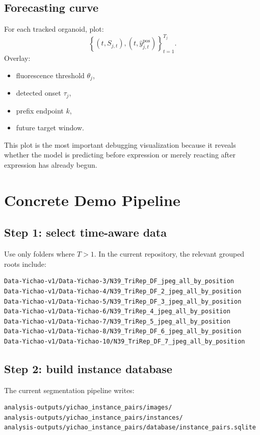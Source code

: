 \documentclass[11pt]{article}
\newcommand{\1}{\mathbf{1}}
\begin{document}
\subsection{Forecasting curve}
For each tracked organoid, plot:
\begin{equation}
\left\{(t,S_{j,t}), (t,\hat{y}_{j,t}^{\mathrm{pos}})\right\}_{t=1}^{T_j}.
\end{equation}
Overlay:
\begin{itemize}[leftmargin=1.5em]
  \item fluorescence threshold \(\theta_j\),
  \item detected onset \(\tau_j\),
  \item prefix endpoint \(k\),
  \item future target window.
\end{itemize}

This plot is the most important debugging visualization because it reveals whether the model is predicting before expression or merely reacting after expression has already begun.

\section{Concrete Demo Pipeline}
\subsection{Step 1: select time-aware data}
Use only folders where \(T>1\). In the current repository, the relevant grouped roots include:
\begin{verbatim}
Data-Yichao-v1/Data-Yichao-3/N39_TriRep_DF_jpeg_all_by_position
Data-Yichao-v1/Data-Yichao-4/N39_TriRep_DF_2_jpeg_all_by_position
Data-Yichao-v1/Data-Yichao-5/N39_TriRep_DF_3_jpeg_all_by_position
Data-Yichao-v1/Data-Yichao-6/N39_TriRep_4_jpeg_all_by_position
Data-Yichao-v1/Data-Yichao-7/N39_TriRep_5_jpeg_all_by_position
Data-Yichao-v1/Data-Yichao-8/N39_TriRep_DF_6_jpeg_all_by_position
Data-Yichao-v1/Data-Yichao-10/N39_TriRep_DF_7_jpeg_all_by_position
\end{verbatim}

\subsection{Step 2: build instance database}
The current segmentation pipeline writes:
\begin{verbatim}
analysis-outputs/yichao_instance_pairs/images/
analysis-outputs/yichao_instance_pairs/instances/
analysis-outputs/yichao_instance_pairs/database/instance_pairs.sqlite
\end{verbatim}
\end{document}

